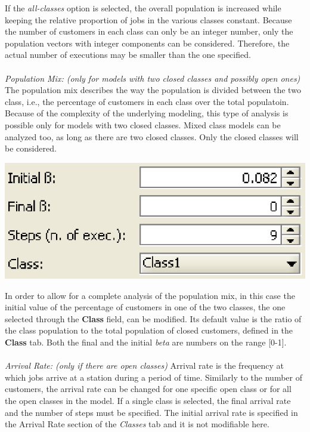 \begin{description*}
If the \emph{all-classes} option is selected, the overall population is increased while keeping the relative proportion of jobs in the various classes constant. Because the number of customers in each class can only be an integer number, only the population vectors with integer components can be considered. Therefore, the actual number of executions may be smaller than the one specified.\\\\
\textit{Population Mix: (only for models with two closed classes and possibly open ones)}
The population mix describes the way the population is divided between the two class, i.e., the percentage of customers in each class over the total populatoin. Because of the complexity of the underlying modeling, this type of analysis is possible only for models with two closed classes. Mixed class models can be analyzed too, as long as there are two closed classes. Only the closed classes will be considered. 
\begin{center}
\includegraphics[scale=.5]{img/jsim/popmix.eps}
\end{center}
In order to allow for a complete analysis of the population mix, in this case the initial value of the percentage of customers in one of the two classes, the one selected through the \textbf{Class} field, can be modified. Its default value is the ratio of the class population to the total population of closed customers, defined in the \textbf{Class} tab. Both the final and the initial \emph{beta} are numbers on the range [0-1].\\\\
\textit{Arrival Rate: (only if there are open classes)}
Arrival rate is the frequency at which jobs arrive at a station during a period of time.
Similarly to the number of customers, the arrival rate can be changed for one specific open class or for all the open classes in the model. If a single class is selected, the final arrival rate and the number of steps must be specified. The initial arrival rate is specified in the Arrival Rate section of the \textit{Classes} tab and it is not modifiable here.

\end{description*}
